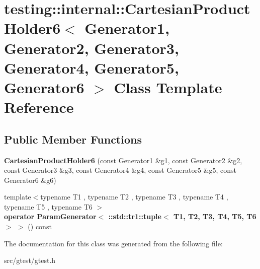 \hypertarget{classtesting_1_1internal_1_1_cartesian_product_holder6}{}\section{testing\+:\+:internal\+:\+:Cartesian\+Product\+Holder6$<$ Generator1, Generator2, Generator3, Generator4, Generator5, Generator6 $>$ Class Template Reference}
\label{classtesting_1_1internal_1_1_cartesian_product_holder6}
\subsection*{Public Member Functions}
\begin{DoxyCompactItemize}
\item 
\mbox{\label{classtesting_1_1internal_1_1_cartesian_product_holder6_a7bb6f9224a1a6766e3634eb392e1b5f6}} 
{\bfseries Cartesian\+Product\+Holder6} (const Generator1 \&g1, const Generator2 \&g2, const Generator3 \&g3, const Generator4 \&g4, const Generator5 \&g5, const Generator6 \&g6)
\item 
\mbox{\label{classtesting_1_1internal_1_1_cartesian_product_holder6_a796b55c8cd6f7606354ededaa39ca76d}} 
{\footnotesize template$<$typename T1 , typename T2 , typename T3 , typename T4 , typename T5 , typename T6 $>$ }\\{\bfseries operator Param\+Generator$<$ \+::std\+::tr1\+::tuple$<$ T1, T2, T3, T4, T5, T6 $>$ $>$} () const
\end{DoxyCompactItemize}


The documentation for this class was generated from the following file\+:\begin{DoxyCompactItemize}
\item 
src/gtest/gtest.\+h\end{DoxyCompactItemize}
